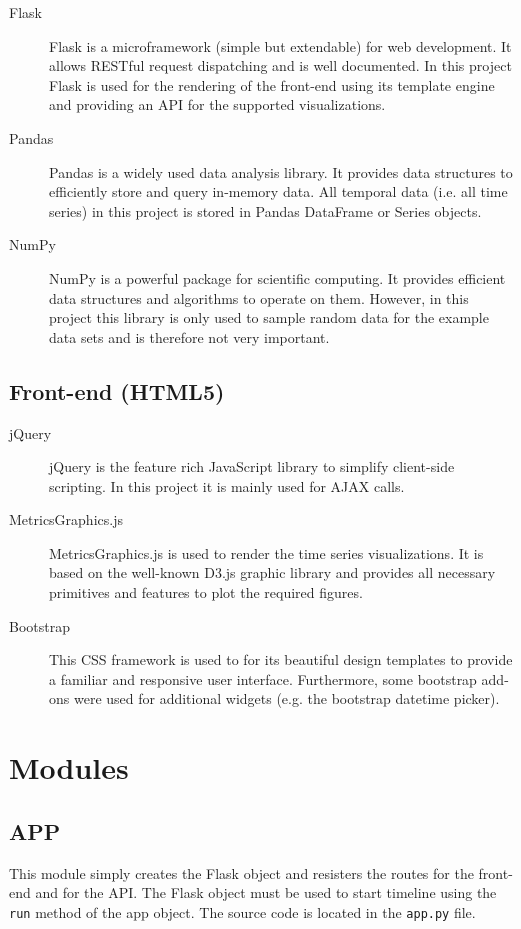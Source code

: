 \documentclass[11pt, a4paper]{article}
\begin{document}
\begin{description}
 \item[Flask] 
 Flask is a microframework (simple but extendable) for web development. 
 It allows RESTful request dispatching and is well documented. 
 In this project Flask is used for the rendering of the front-end using its template engine and providing an API for the supported visualizations.
 
 \item[Pandas] 
 Pandas is a widely used data analysis library. 
 It provides data structures to efficiently store and query in-memory data. 
 All temporal data (i.e. all time series) in this project is stored in Pandas DataFrame or Series objects. 
 
 \item[NumPy] 
 NumPy is a powerful package for scientific computing. 
 It provides efficient data structures and algorithms to operate on them. 
 However, in this project this library is only used to sample random data for the example data sets and is therefore not very important. 
\end{description}


\subsection{Front-end (HTML5)}

\begin{description}
 \item[jQuery] jQuery is the feature rich JavaScript library to simplify client-side scripting. 
 In this project it is mainly used for AJAX calls.
 \item[MetricsGraphics.js] MetricsGraphics.js is used to render the time series visualizations.
 It is based on the well-known D3.js graphic library and provides all necessary primitives and features to plot the required figures.
 \item[Bootstrap] This CSS framework is used to for its beautiful design templates to provide a familiar and responsive user interface.
 Furthermore, some bootstrap add-ons were used for additional widgets (e.g. the bootstrap datetime picker).
\end{description}


\section{Modules}\label{sec:modules}

\subsection{APP}
This module simply creates the Flask object and resisters the routes for the front-end and for the API.
The Flask object must be used to start timeline using the \texttt{run} method of the app object. 
The source code is located in the \texttt{app.py} file.
\end{document}
